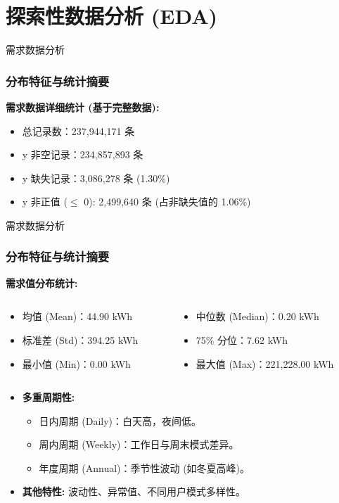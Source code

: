\documentclass{beamer} %
\begin{document}
\section{探索性数据分析 (EDA)}

\begin{frame}{需求数据分析}
    \frametitle{分布特征与统计摘要}
    \textbf{需求数据详细统计 (基于完整数据):}
    \begin{itemize}
        \item 总记录数：237,944,171 条
        \item y 非空记录：234,857,893 条
        \item y 缺失记录：3,086,278 条 (1.30\%)
        \item y 非正值 ($\leq$ 0): 2,499,640 条 (占非缺失值的 1.06\%)
    \end{itemize}
\end{frame}

\begin{frame}{需求数据分析}
    \frametitle{分布特征与统计摘要}
    \textbf{需求值分布统计:}
    \begin{columns}
        \begin{column}{0.48\textwidth}
            \begin{itemize}
                \item 均值 (Mean)：44.90 kWh
                \item 标准差 (Std)：394.25 kWh
                \item 最小值 (Min)：0.00 kWh
            \end{itemize}
        \end{column}
        \begin{column}{0.48\textwidth}
            \begin{itemize}
                \item 中位数 (Median)：0.20 kWh
                \item 75\% 分位：7.62 kWh
                \item 最大值 (Max)：221,228.00 kWh
            \end{itemize}
        \end{column}
    \end{columns}

    \begin{itemize}
        \item \textbf{多重周期性:}
        \begin{itemize}
        \item 日内周期 (Daily)：白天高，夜间低。
        \item 周内周期 (Weekly)：工作日与周末模式差异。
        \item 年度周期 (Annual)：季节性波动 (如冬夏高峰)。
        \end{itemize}
        \item \textbf{其他特性:} 波动性、异常值、不同用户模式多样性。
    \end{itemize}
\end{frame}
\end{document}
